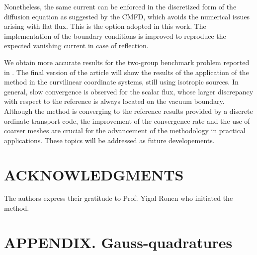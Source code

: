\documentclass{ictt26}
\begin{document}
Nonetheless, the same current can be enforced in the discretized form of the diffusion equation as suggested by the CMFD, which avoids the numerical issues arising with flat flux. This is the option adopted in this work. The implementation of the boundary conditions is improved to reproduce the expected vanishing current in case of reflection.

We obtain more accurate results for the two-group benchmark problem reported in \cite{tomatis2011application}. The final version of the article will show the results of the application of the method in the curvilinear coordinate systems, still using isotropic sources. In general, slow convergence is observed for the scalar flux, whose larger discrepancy with respect to the reference is always located on the vacuum boundary. Although the method is converging to the reference results provided by a discrete ordinate transport code, the improvement of the convergence rate and the use of coarser meshes are crucial for the advancement of the methodology in practical applications. These topics will be addressed as future developements.


\section*{ACKNOWLEDGMENTS}

The authors express their gratitude to Prof. Yigal Ronen who initiated the method.

\appendix
\section{APPENDIX. Gauss-quadratures}
\label{sec:apx_Flurig}
\end{document}
